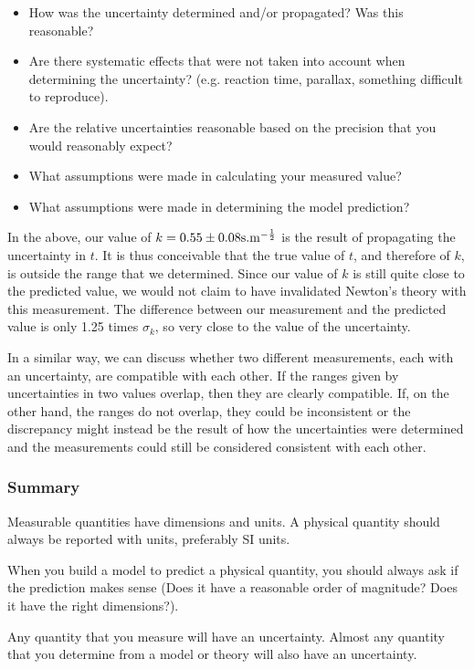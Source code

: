 \begin{itemize}
\item How was the uncertainty determined and/or propagated? Was this reasonable?
\item Are there systematic effects that were not taken into account when determining the uncertainty? (e.g. reaction time, parallax, something difficult to reproduce).
\item Are the relative uncertainties reasonable based on the precision that you would reasonably expect?
\item What assumptions were made in calculating your measured value?
\item What assumptions were made in determining the model prediction?
\end{itemize}

In the above, our value of $k= 0.55 \pm 0.08 {\rm s.m^{ -\frac{1}{2}}}$ is the result of propagating the uncertainty in $t$. It is thus conceivable that the true value of $t$, and therefore of $k$, is outside the range that we determined. Since our value of $k$ is still quite close to the predicted value, we would not claim to have invalidated Newton's theory with this measurement. The difference between our measurement and the predicted value is only 1.25 times $\sigma_k$, so very close to the value of the uncertainty.

In a similar way, we can discuss whether two different measurements, each with an uncertainty, are compatible with each other. If the ranges given by uncertainties in two values overlap, then they are clearly compatible. If, on the other hand, the ranges do not overlap, they could be inconsistent or the discrepancy might instead be the result of how the uncertainties were determined and the measurements could still be considered consistent with each other.

\subsubsection{Summary}

Measurable quantities have dimensions and units. A physical quantity should always be reported with units, preferably SI units.

When you build a model to predict a physical quantity, you should always ask if the prediction makes sense (Does it have a reasonable order of magnitude? Does it have the right dimensions?).

Any quantity that you measure will have an uncertainty. Almost any quantity that you determine from a model or theory will also have an uncertainty.

